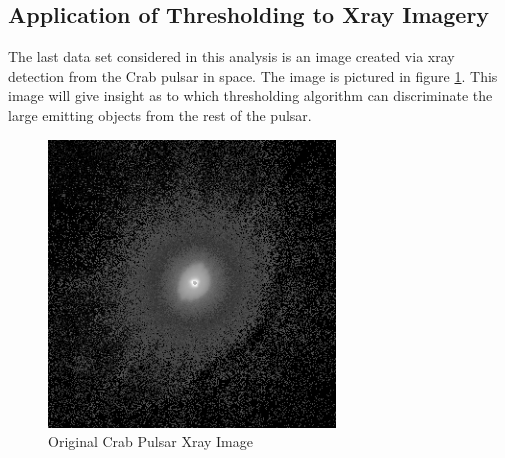 \documentclass[journal]{IEEEtran}
\begin{document}
\subsection{Application of Thresholding to Xray Imagery}
\par The last data set considered in this analysis is an image created via xray detection from the Crab pulsar in space. The image is pictured in figure \ref{fig:xray}. This image will give insight as to which thresholding algorithm can discriminate the large emitting objects from the rest of the pulsar.

\begin{figure}[!h]
\centering
\includegraphics[width=3in]{../images/crabpulsar-xray.png}
\caption{Original Crab Pulsar Xray Image}
\label{fig:xray}
\end{figure}
\end{document}
